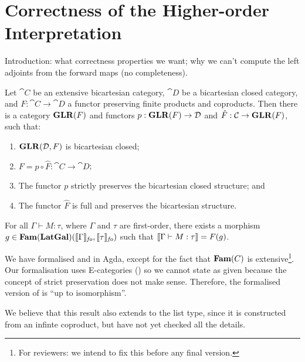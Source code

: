 \section{Correctness of the Higher-order Interpretation}
\label{sec:definability}

Introduction: what correctness properties we want; why we can't
compute the left adjoints from the forward maps (no completeness).

\begin{theorem}
  \label{thm:glr-definability}
  Let $\cat{C}$ be an extensive bicartesian category, $\cat{D}$ be a
  bicartesian closed category, and $F : \cat{C} \to \cat{D}$ a functor
  preserving finite products and coproducts. Then there is a category
  $\mathbf{GLR}(F)$ and functors $p : \mathbf{GLR}(F) \to \mathcal{D}$ and
  $\hat{F} : \mathcal{C} \to \mathbf{GLR}(F)$, such that:
  \begin{enumerate}
  \item $\mathbf{GLR}(\mathcal{D},F)$ is bicartesian closed;
  \item $F = p \circ \hat{F} : \cat{C} \to \cat{D}$;
  \item The functor $p$ strictly preserves the bicartesian closed structure; and
  \item The functor $\hat{F}$ is full and preserves the bicartesian structure.
  \end{enumerate}
\end{theorem}

\begin{theorem}
  \label{thm:language-definability}
  For all $\Gamma \vdash M : \tau$, where $\Gamma$ and $\tau$ are
  first-order, there exists a morphism
  $g \in \mathbf{Fam}(\mathbf{LatGal})(\llbracket \Gamma \rrbracket_{\mathit{fo}},
  \llbracket \tau \rrbracket_{\mathit{fo}})$ such that
  $\llbracket \Gamma \vdash M : \tau \rrbracket = F(g)$.
\end{theorem}

\begin{remark}
  We have formalised  and
   in Agda, except for the fact that
  $\mathbf{Fam}(C)$ is extensive\footnote{For reviewers: we intend to fix this
    before any final version.}. Our formalisation uses E-categories
  (\cite{palmgren-wilander}) so we cannot state
   as given because the concept of strict
  preservation does not make sense. Therefore, the formalised version
  of  is ``up to isomorphism''.

  We believe that this result also extends to the list type, since it
  is constructed from an infinte coproduct, but have not yet checked
  all the details.
\end{remark}

